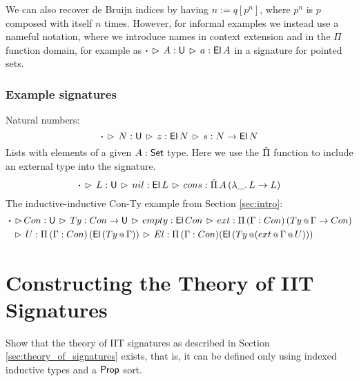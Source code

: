 \documentclass[a4paper,UKenglish,cleveref, autoref]{lipics-v2019}
\begin{document}
We can also recover de Bruijn indices by having $n := q[p^n]$, where $p^n$ is
$p$ composed with itself $n$ times. However, for informal examples we instead
use a nameful notation, where we introduce names in context extension and in the
$\Pi$ function domain, for example as $\boldsymbol{\cdot}\,\rhd\,A : \mathsf{U}\,\rhd\,a :
\mathsf{El}\,A$ in a signature for pointed sets.

\subsubsection{Example signatures}

Natural numbers:
\[
\boldsymbol{\cdot}\,\rhd\,N:\mathsf{U}\,\rhd\,z : \mathsf{El}\,N\,\rhd\,s : N \rightarrow \mathsf{El}\,N
\]
Lists with elements of a given $A : \mathsf{Set}$ type. Here we use the $\hat{\Pi}$ function
to include an external type into the signature.
\[
\boldsymbol{\cdot}\,\rhd\,L:\mathsf{U}\,\rhd\,nil : \mathsf{El}\,L\,\rhd\,
      cons : \hat{\Pi}\,A\,(\lambda \_.\, L\rightarrow L)
\]
The inductive-inductive Con-Ty example from Section \ref{sec:intro}:
\begin{alignat*}{3}
  & \boldsymbol{\cdot} \,\rhd\,Con : \mathsf{U}\,\rhd\,Ty : Con\rightarrow\mathsf{U}\,\rhd\,empty : \mathsf{El}\,Con\,\rhd\,ext : \Pi\,(\Gamma : Con)\,(Ty\mathop{{\scriptstyle @}}\Gamma \rightarrow Con) \\
  & \hspace{0.5em}\,\rhd\, U : \Pi\,(\Gamma:Con)\,(\mathsf{El}\,(Ty\mathop{{\scriptstyle @}}\Gamma))
    \,\rhd\,El : \Pi\,(\Gamma : Con)(\mathsf{El}\,(Ty\mathop{{\scriptstyle @}}(ext\mathop{{\scriptstyle @}}\Gamma\mathop{{\scriptstyle @}} U)))
\end{alignat*}




\section{Constructing the Theory of IIT Signatures}
\label{sec:ambroise}


Show that the theory of IIT signatures as described in Section
\ref{sec:theory_of_signatures} exists, that is, it can be defined only
using indexed inductive types and a $\mathsf{Prop}$ sort.
\end{document}
